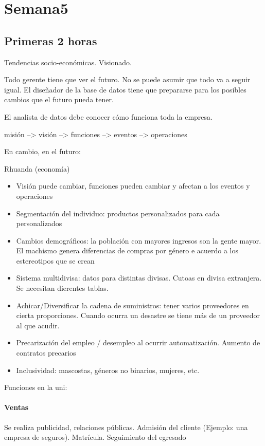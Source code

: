 \section*{Semana5}
\justifying

\subsection*{Primeras 2 horas}

Tendencias socio-económicas. Visionado.

Todo gerente tiene que ver el futuro. No se puede asumir que todo va a seguir igual.
El diseñador de la base de datos tiene que prepararse para los posibles cambios que el futuro pueda tener.

El analista de datos debe conocer cómo funciona toda la empresa. 

misión --> visión --> funciones --> eventos --> operaciones

En cambio, en el futuro:

Rhuanda (economía)
\begin{itemize}
\item Visión puede cambiar, funciones pueden cambiar y afectan a los eventos y operaciones
\item Segmentación del individuo: productos personalizados para cada personalizados
\item Cambios demográficos: la población con mayores ingresos son la gente mayor. El machismo genera diferencias de compras por género e acuerdo a los estereotipos que se crean
\item Sistema multidivisa: datos para distintas divisas. Cutoas en divisa extranjera. Se necesitan dierentes tablas.
\item Achicar/Diversificar la cadena de suministros: tener varios proveedores en cierta proporciones. Cuando ocurra un desastre se tiene más de un proveedor al que acudir.
\item Precarización del empleo / desempleo al ocurrir automatización. Aumento de contratos precarios
\item Inclusividad: mascostas, géneros no binarios, mujeres, etc.
\end{itemize}

Funciones en la uni:

\paragraph*{Ventas} Se realiza publicidad, relaciones públicas. Admisión del cliente (Ejemplo: una empresa de seguros). Matrícula. Seguimiento del egresado
